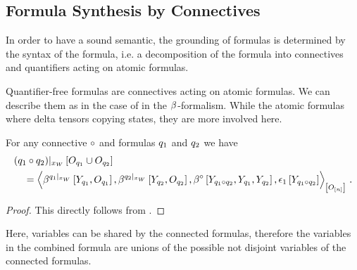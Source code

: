 \subsection{Formula Synthesis by Connectives}\label{sec:folConnectiveRepresentation}

In order to have a sound semantic, the grounding of \firstOrderLogic{} formulas is determined by the syntax of the formula, i.e. a decomposition of the formula into connectives and quantifiers acting on atomic formulas.

Quantifier-free formulas are connectives acting on atomic formulas.
We can describe them as in the case of \propositionalLogic{} in the $\beta^{}$-formalism.
While the atomic formulas where delta tensors copying states, they are more involved here.

\begin{theorem}
    For any connective $\circ$ and formulas $q_1$ and $q_2$ we have
    \begin{align}
        &\groundingofat{(\folexformula_1\exconnective\folexformula_2)}{\indvariableof{\folexformula_1}\cup\indvariableof{\folexformula_2}} \\
        &\quad=
        \contractionof{
            \bencodingofat{\groundingof{\folexformula_1}}{\headvariableof{\folexformula_1},\indvariableof{\folexformula_1}},
            \bencodingofat{\groundingof{\folexformula_2}}{\headvariableof{\folexformula_2},\indvariableof{\folexformula_2}},
            \bencodingofat{\exconnective}{\headvariableof{\folexformula_1\exconnective\folexformula_2}, \headvariableof{\folexformula_1}, \headvariableof{\folexformula_2}},
            \tbasisat{\headvariableof{\folexformula_1\exconnective\folexformula_2}}
        }
        {\shortindvariablelist} \, .
    \end{align}
\end{theorem}
\begin{proof}
    This directly follows from .
\end{proof}

Here, variables can be shared by the connected formulas, therefore the variables in the combined formula are unions of the possible not disjoint variables of the connected formulas.


